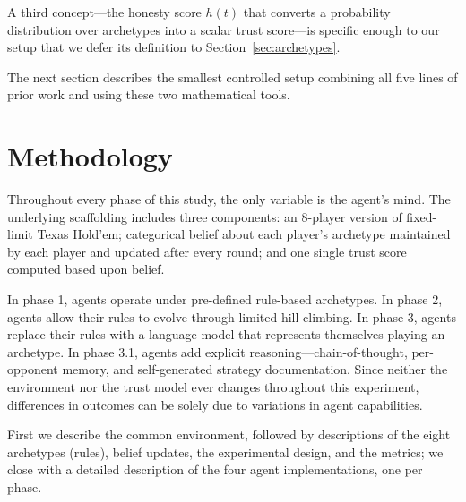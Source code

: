 \documentclass[10pt,twocolumn,letterpaper]{article}
\begin{document}
A third concept---the honesty score $h(t)$ that converts a
probability distribution over archetypes into a scalar trust
score---is specific enough to our setup that we defer its
definition to Section~\ref{sec:archetypes}.

The next section describes the smallest controlled setup combining
all five lines of prior work and using these two mathematical tools.

\section{Methodology}

Throughout every phase of this study, the only variable is the
agent's mind. The underlying scaffolding includes three components:
an 8-player version of fixed-limit Texas Hold'em; categorical belief
about each player's archetype maintained by each player and updated
after every round; and one single trust score computed based upon
belief.

In phase 1, agents operate under pre-defined rule-based archetypes.
In phase 2, agents allow their rules to evolve through limited hill
climbing. In phase 3, agents replace their rules with a language
model that represents themselves playing an archetype. In phase 3.1,
agents add explicit reasoning---chain-of-thought, per-opponent
memory, and self-generated strategy documentation. Since neither the
environment nor the trust model ever changes throughout this
experiment, differences in outcomes can be solely due to variations
in agent capabilities.

First we describe the common environment, followed by descriptions
of the eight archetypes (rules), belief updates, the experimental
design, and the metrics; we close with a detailed description of the
four agent implementations, one per phase.
\end{document}
